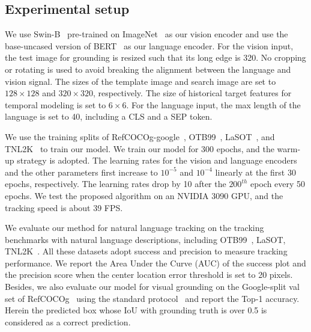 \newcommand{\tabincell}[2]{\begin{tabular}{@{}#1@{}}#2\end{tabular}}

\subsection{Experimental setup}
We use Swin-B~\cite{SWIN} pre-trained on ImageNet~\cite{imagenet} as our vision encoder and use the base-uncased version of BERT~\cite{devlin2018bert} as our language encoder. 
For the vision input, the test image for grounding is resized such that its long edge is 320. No cropping or rotating is used to avoid breaking the alignment between the language and vision signal. The sizes of the template image and search image are set to $128\times128$ and $320\times320$, respectively. 
The size of historical target features for temporal modeling is set to $6\times 6$.
For the language input, the max length of the language is set to 40, including a CLS and a SEP token. 

We use the training splits of RefCOCOg-google~\cite{REFCOCO}, OTB99~\cite{li2017tracking}, LaSOT~\cite{LASOT}, and TNL2K~\cite{TNL2K} to train our model. 
We train our model for 300 epochs, and the warm-up strategy is adopted. 
The learning rates for the vision and language encoders and the other parameters first increase to $10^{-5}$ and $10^{-4}$ linearly at the first 30 epochs, respectively. 
The learning rates drop by 10 after the $200^{th}$ epoch every 50 epochs. 
We test the proposed algorithm on an NVIDIA 3090 GPU, and the tracking speed is about 39 FPS.

We evaluate our method for natural language tracking on the tracking benchmarks with natural language descriptions, including OTB99~\cite{li2017tracking}, LaSOT\cite{LASOT}, TNL2K~\cite{TNL2K}. 
All these datasets adopt success and precision to measure tracking performance. 
We report the Area Under the Curve (AUC) of the success plot and the precision score when the center location error threshold is set to 20 pixels.
Besides, we also evaluate our model for visual grounding on the Google-split val set of RefCOCOg~\cite{REFCOCO} using the standard protocol~\cite{2019onestagevg, transvg, VLTVG} and report the Top-1 accuracy. Herein the predicted box whose IoU with grounding truth is over 0.5 is considered as a correct prediction.

